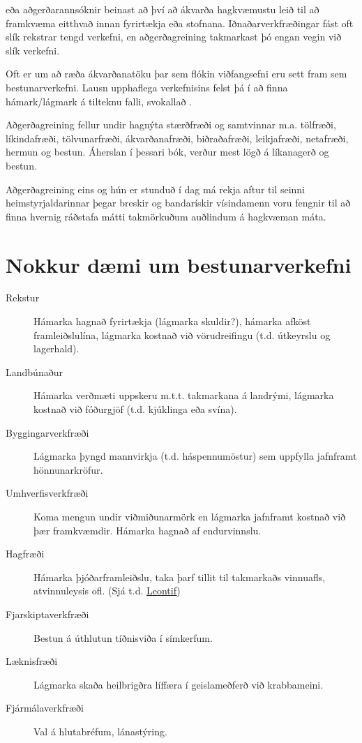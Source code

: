  eða aðgerðarannsóknir beinast að því að ákvarða hagkvæmustu leið til að framkvæma eitthvað innan fyrirtækja eða stofnana. Iðnaðarverkfræðingar fást oft slík rekstrar tengd verkefni, en aðgerðagreining takmarkast þó engan vegin við slík verkefni. 

Oft er um að ræða ákvarðanatöku þar sem flókin viðfangsefni eru sett fram sem bestunarverkefni. Lausn upphaflega verkefnisins felst þá í að finna hámark/lágmark á tilteknu falli, svokallað . 

Aðgerðagreining fellur undir hagnýta stærðfræði og samtvinnar m.a. tölfræði, líkindafræði, tölvunarfræði, ákvarðanafræði, biðraðafræði, leikjafræði, netafræði, hermun og bestun. Áherslan í þessari bók, verður mest lögð á líkanagerð og bestun. 

Aðgerðagreining eins og hún er stunduð í dag má rekja aftur til seinni heimstyrjaldarinnar þegar breskir og bandarískir vísindamenn voru fengnir til að finna hvernig ráðstafa mátti takmörkuðum auðlindum á hagkvæman máta. 

\section{Nokkur dæmi um bestunarverkefni} 
\begin{description} 
\item[Rekstur] Hámarka hagnað fyrirtækja (lágmarka skuldir?), hámarka afköst framleiðslulína, lágmarka kostnað við vörudreifingu (t.d. útkeyrslu og lagerhald). 
\item[Landbúnaður] Hámarka verðmæti uppskeru m.t.t. takmarkana á landrými, lágmarka kostnað við fóðurgjöf (t.d. kjúklinga eða svína). 
\item[Byggingarverkfræði] Lágmarka þyngd mannvirkja (t.d. háspennumöstur) sem uppfylla jafnframt hönnunarkröfur. 
\item[Umhverfisverkfræði] Koma mengun undir viðmiðunarmörk en lágmarka jafnframt kostnað við þær framkvæmdir. Hámarka hagnað af endur\-vinnslu. 
\item[Hagfræði] Hámarka þjóðarframleiðslu, taka þarf tillit til takmarkaðs vinnuafls, atvinnuleysis ofl. (Sjá t.d. \href{http://en.wikipedia.org/wiki/Wassily_Leontief}{Leontif}) 
\item[Fjarskiptaverkfræði] Bestun á úthlutun tíðnisviða í símkerfum. 
\item[Læknisfræði] Lágmarka skaða heilbrigðra líffæra í geislameðferð við krabba\-meini. 
\item[Fjármálaverkfræði] Val á hlutabréfum, lánastýring.
\end{description}


